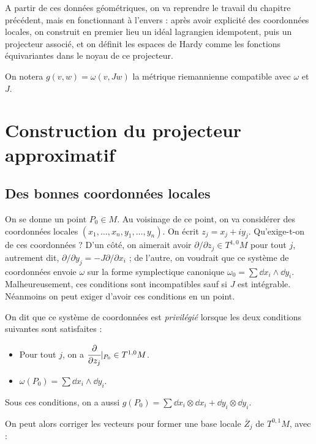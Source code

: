 A partir de ces données géométriques, on va reprendre le travail du chapitre précédent, mais en fonctionnant à l'envers : après avoir explicité des coordonnées locales, on construit en premier lieu un idéal lagrangien idempotent, puis un projecteur associé, et on définit les espaces de Hardy comme les fonctions équivariantes dans le noyau de ce projecteur.

On notera $g(v,w)=\omega(v,Jw)$ la métrique riemannienne compatible avec $\omega$ et $J$.

\section{Construction du projecteur approximatif}

\subsection{Des bonnes coordonnées locales}

On se donne un point $P_0 \in M$. Au voisinage de ce point, on va considérer des coordonnées locales $(x_1,\ldots, x_n,y_1,\ldots, y_n)$. On écrit $z_j=x_j+iy_j$. Qu'exige-t-on de ces coordonnées ? D'un côté, on aimerait avoir $\partial/\partial z_j \in T^{1,0}M$ pour tout $j$, autrement dit, $\partial/\partial y_j = -J\partial/\partial x_i$ ; de l'autre, on voudrait que ce système de coordonnées envoie $\omega$ sur la forme symplectique canonique $\omega_0 = \sum \dd x_i \wedge \dd y_i$. Malheureusement, ces conditions sont incompatibles sauf si $J$ est intégrable. Néanmoins on peut exiger d'avoir ces conditions en un point.

\begin{defn}
	On dit que ce système de coordonnées est \emph{privilégié} lorsque les deux conditions suivantes sont satisfaites :
	\begin{itemize}
		\item Pour tout $j$, on a $\cfrac{\partial}{\partial z_j}|_{P_0} \in T^{1,0}M$.
		\item $\omega(P_0)=\sum \dd x_i \wedge \dd y_i$.
	\end{itemize}
\end{defn}

\begin{rem}
	Sous ces conditions, on a aussi $g(P_0) = \sum \dd x_i \otimes \dd x_i + \dd y_i \otimes \dd y_i$.
\end{rem}

On peut alors corriger les vecteurs pour former une base locale $\overline{Z}_j$ de $T^{0,1}M$, avec :

